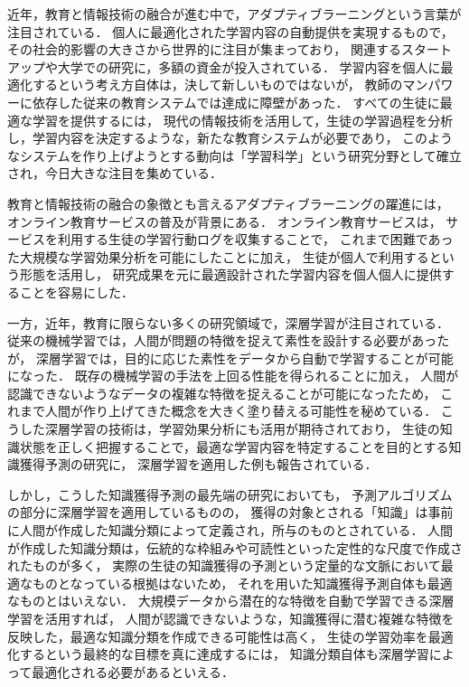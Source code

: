 近年，教育と情報技術の融合が進む中で，アダプティブラーニングという言葉が注目されている．
個人に最適化された学習内容の自動提供を実現するもので，その社会的影響の大きさから世界的に注目が集まっており，
関連するスタートアップや大学での研究に，多額の資金が投入されている．
学習内容を個人に最適化するという考え方自体は，決して新しいものではないが，
教師のマンパワーに依存した従来の教育システムでは達成に障壁があった．
すべての生徒に最適な学習を提供するには，
現代の情報技術を活用して，生徒の学習過程を分析し，学習内容を決定するような，新たな教育システムが必要であり，
このようなシステムを作り上げようとする動向は「学習科学」という研究分野として確立され，今日大きな注目を集めている．


教育と情報技術の融合の象徴とも言えるアダプティブラーニングの躍進には，
オンライン教育サービスの普及が背景にある．
オンライン教育サービスは，
サービスを利用する生徒の学習行動ログを収集することで，
これまで困難であった大規模な学習効果分析を可能にしたことに加え，
生徒が個人で利用するという形態を活用し，
研究成果を元に最適設計された学習内容を個人個人に提供することを容易にした．


一方，近年，教育に限らない多くの研究領域で，深層学習が注目されている．
従来の機械学習では，人間が問題の特徴を捉えて素性を設計する必要があったが，
深層学習では，目的に応じた素性をデータから自動で学習することが可能になった．
既存の機械学習の手法を上回る性能を得られることに加え，
人間が認識できないようなデータの複雑な特徴を捉えることが可能になったため，
これまで人間が作り上げてきた概念を大きく塗り替える可能性を秘めている．
こうした深層学習の技術は，学習効果分析にも活用が期待されており，
生徒の知識状態を正しく把握することで，最適な学習内容を特定することを目的とする知識獲得予測の研究に，
深層学習を適用した例も報告されている．

しかし，こうした知識獲得予測の最先端の研究においても，
予測アルゴリズムの部分に深層学習を適用しているものの，
獲得の対象とされる「知識」は事前に人間が作成した知識分類によって定義され，所与のものとされている．
人間が作成した知識分類は，伝統的な枠組みや可読性といった定性的な尺度で作成されたものが多く，
実際の生徒の知識獲得の予測という定量的な文脈において最適なものとなっている根拠はないため，
それを用いた知識獲得予測自体も最適なものとはいえない．
大規模データから潜在的な特徴を自動で学習できる深層学習を活用すれば，
人間が認識できないような，知識獲得に潜む複雑な特徴を反映した，最適な知識分類を作成できる可能性は高く，
生徒の学習効率を最適化するという最終的な目標を真に達成するには，
知識分類自体も深層学習によって最適化される必要があるといえる．


